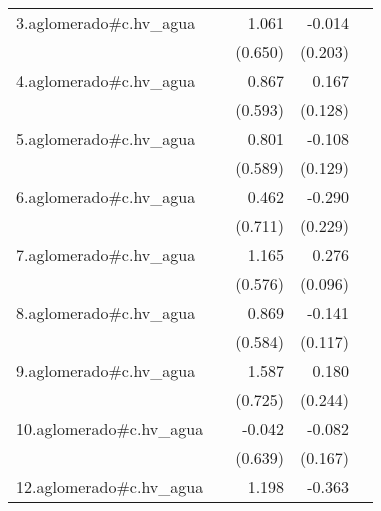 {\begin{longtable}{l*{4}{D{.}{.}{-1}}}
\addlinespace
3.aglomerado#c.hv\_agua&                     &       1.061         &      -0.014         &                     \\
            &                     &     (0.650)         &     (0.203)         &                     \\
\addlinespace
4.aglomerado#c.hv\_agua&                     &       0.867         &       0.167         &                     \\
            &                     &     (0.593)         &     (0.128)         &                     \\
\addlinespace
5.aglomerado#c.hv\_agua&                     &       0.801         &      -0.108         &                     \\
            &                     &     (0.589)         &     (0.129)         &                     \\
\addlinespace
6.aglomerado#c.hv\_agua&                     &       0.462         &      -0.290         &                     \\
            &                     &     (0.711)         &     (0.229)         &                     \\
\addlinespace
7.aglomerado#c.hv\_agua&                     &       1.165\sym{*}  &       0.276\sym{**} &                     \\
            &                     &     (0.576)         &     (0.096)         &                     \\
\addlinespace
8.aglomerado#c.hv\_agua&                     &       0.869         &      -0.141         &                     \\
            &                     &     (0.584)         &     (0.117)         &                     \\
\addlinespace
9.aglomerado#c.hv\_agua&                     &       1.587\sym{*}  &       0.180         &                     \\
            &                     &     (0.725)         &     (0.244)         &                     \\
\addlinespace
10.aglomerado#c.hv\_agua&                     &      -0.042         &      -0.082         &                     \\
            &                     &     (0.639)         &     (0.167)         &                     \\
\addlinespace
12.aglomerado#c.hv\_agua&                     &       1.198         &      -0.363         &                     \\

\end{longtable}}
